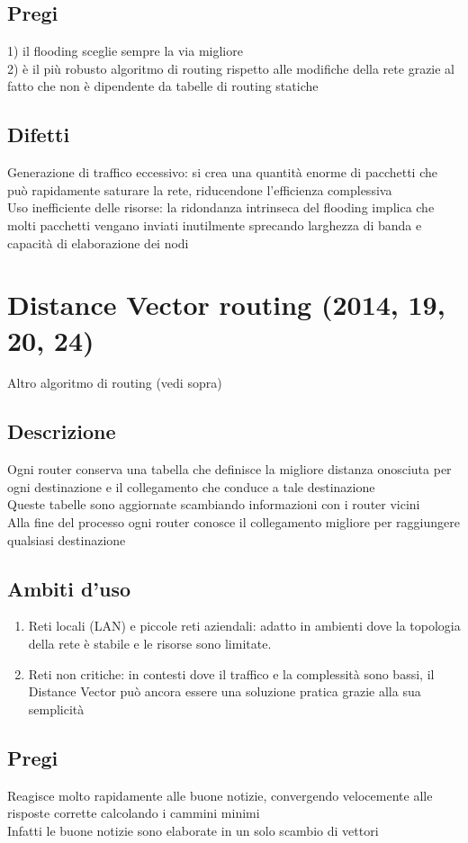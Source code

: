 \documentclass[10pt,oneside,a4paper]{article}
\begin{document}
\subsection{Pregi}
1) il flooding sceglie sempre la via migliore\\
2) è il più robusto algoritmo di routing rispetto alle modifiche della rete grazie al fatto che non è dipendente da tabelle di routing statiche
\subsection{Difetti}
Generazione di traffico eccessivo: si crea una quantità enorme di pacchetti che può rapidamente saturare la rete, riducendone l'efficienza complessiva \\
Uso inefficiente delle risorse: la ridondanza intrinseca del flooding implica che molti pacchetti vengano inviati inutilmente sprecando larghezza di banda e capacità di elaborazione dei nodi
\section{Distance Vector routing (2014, 19, 20, 24)}
Altro algoritmo di routing (vedi sopra)\\
\subsection{Descrizione}
Ogni router conserva una tabella che definisce la migliore distanza onosciuta per ogni destinazione e il collegamento che conduce a tale destinazione\\
Queste tabelle sono aggiornate scambiando informazioni con i router vicini\\
Alla fine del processo ogni router conosce il collegamento migliore per raggiungere qualsiasi destinazione
\subsection{Ambiti d'uso}
\begin{enumerate}
\item Reti locali (LAN) e piccole reti aziendali: adatto in ambienti dove la topologia della rete è stabile e le risorse sono limitate.
\item Reti non critiche: in contesti dove il traffico e la complessità sono bassi, il Distance Vector può ancora essere una soluzione pratica grazie alla sua semplicità
\end{enumerate}
\subsection{Pregi}
Reagisce molto rapidamente alle buone notizie, convergendo velocemente alle risposte corrette calcolando i cammini minimi\\
Infatti le buone notizie sono elaborate in un solo scambio di vettori 
\end{document}
